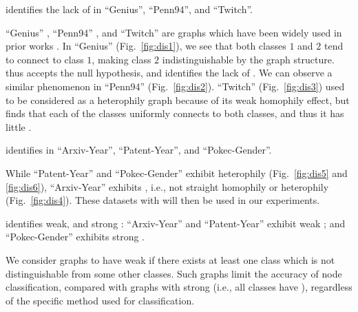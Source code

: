 \begin{discovery}[No \nef]
\methodtest identifies the lack of \nef in ``Genius'', ``Penn94'', and ``Twitch''.
\end{discovery}
\noindent
``Genius'' \cite{lim2020expertise}, ``Penn94'' \cite{traud2012social}, and ``Twitch'' \cite{rozemberczki2021twitch} are graphs which have been widely used in prior works \cite{liu2022ud, li2022finding, xiao2022decoupled, wang2022augmentation, park2022deformable}.
In ``Genius'' (Fig.~\ref{fig:dis1}), we see that both classes $1$ and $2$ tend to connect to class $1$, making class $2$ indistinguishable by the graph structure. 
\methodtest thus accepts the null hypothesis, and identifies the lack of \nef.
We can observe a similar phenomenon in ``Penn94'' (Fig.~\ref{fig:dis2}).
``Twitch'' (Fig.~\ref{fig:dis3}) used to be considered as a heterophily graph because of its weak homophily effect, but \methodtest finds that each of the classes uniformly connects to both classes, and thus it has little \nef.


\begin{discovery}
\methodtest identifies \nef in ``Arxiv-Year'', ``Patent-Year'', and ``Pokec-Gender''.
\end{discovery}
\noindent
While ``Patent-Year'' and ``Pokec-Gender'' exhibit heterophily (Fig.~\ref{fig:dis5} and \ref{fig:dis6}),
``Arxiv-Year'' exhibits \xophily, i.e., not straight homophily or heterophily (Fig.~\ref{fig:dis4}).
These datasets with \nef will then be used in our experiments.

\begin{discovery}
\methodtest identifies weak, and strong \nef:
``Arxiv-Year'' and ``Patent-Year'' exhibit weak \nef;
and ``Pokec-Gender'' exhibits strong \nef.
\end{discovery}
\noindent
We consider graphs to have weak \nef if there exists at least one class which is not distinguishable from some other classes.
Such graphs limit the accuracy of node classification, compared with graphs with strong \nef (i.e., all classes have \nef), regardless of the specific method used for classification.

